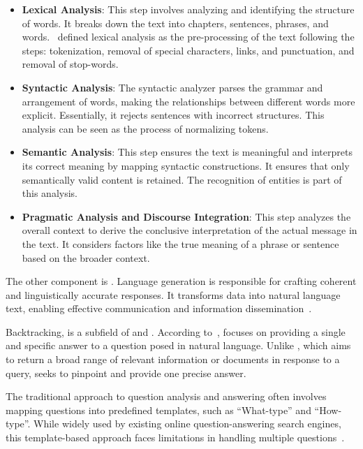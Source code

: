 \begin{itemize}
    \item \textbf{Lexical Analysis}: This step involves analyzing and identifying the structure of words. It breaks down the text into chapters, sentences, phrases, and words.~\citet{chizhik_challenges_2020} defined lexical analysis as the pre-processing of the text following the steps: tokenization, removal of special characters, links, and punctuation, and removal of stop-words.

    \item \textbf{Syntactic Analysis}: The syntactic analyzer parses the grammar and arrangement of words, making the relationships between different words more explicit. Essentially, it rejects sentences with incorrect structures. This analysis can be seen as the process of normalizing tokens.

    \item \textbf{Semantic Analysis}: This step ensures the text is meaningful and interprets its correct meaning by mapping syntactic constructions. It ensures that only semantically valid content is retained. The recognition of entities is part of this analysis.

    \item \textbf{Pragmatic Analysis and Discourse Integration}: This step analyzes the overall context to derive the conclusive interpretation of the actual message in the text. It considers factors like the true meaning of a phrase or sentence based on the broader context.
\end{itemize}

The other component is {\nlg}. Language generation is responsible for crafting coherent and linguistically accurate responses. It transforms data into natural language text, enabling effective communication and information dissemination~\cite{ngai_intelligent_2021}. 

Backtracking, {\qa} is a subfield of {\ir} and {\nlp}. According to~\citet{zhong_building_2020}, {\qa} focuses on providing a single and specific answer to a question posed in natural language. Unlike {\ir}, which aims to return a broad range of relevant information or documents in response to a query, {\qa} seeks to pinpoint and provide one precise answer.

The traditional approach to question analysis and answering often involves mapping questions into predefined templates, such as ``What-type'' and ``How-type''. While widely used by existing online question-answering search engines, this template-based approach faces limitations in handling multiple questions~\cite{zhong_building_2020}. 

